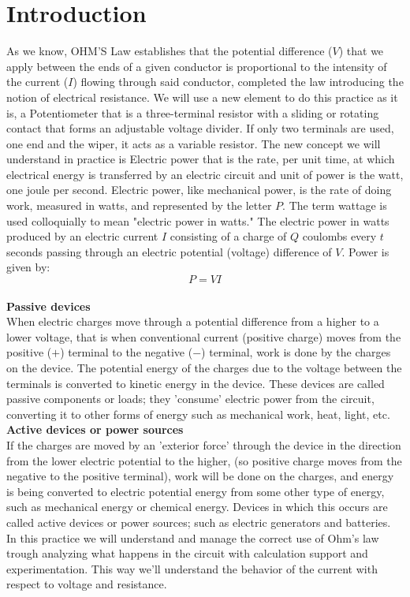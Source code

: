 \documentclass[a4paper]{article}
\begin{document}
\section{Introduction}
As we know, OHM’S Law establishes that the potential difference ($V$) that we apply between the ends
of a given conductor is proportional to the intensity of the current ($I$) flowing through said conductor, completed the law introducing the notion of electrical resistance.
We will use a new element to do this practice as it is, a Potentiometer that is a three-terminal resistor with a sliding or rotating contact that forms an adjustable voltage divider. If only two terminals are used, one end and the wiper, it acts as a variable resistor.
The new concept we will understand in practice is Electric power that is the rate, per unit time, at which electrical energy is transferred by an electric circuit and unit of power is the watt, one joule per second.
Electric power, like mechanical power, is the rate of doing work, measured in watts, and represented
by the letter $P$. The term wattage is used colloquially to mean "electric power in watts." The
electric power in watts produced by an electric current $I$ consisting of a charge of $Q$ coulombs
every $t$ seconds passing through an electric potential (voltage) difference of $V$. Power is given
by:
\[P=VI\]\\
{\large{\textbf{Passive devices}}}\\ When electric charges move through a potential difference from a
higher to a lower voltage, that is when conventional current (positive charge) moves from the
positive ($+$) terminal to the negative ($-$) terminal, work is done by the charges on the device.
The potential energy of the charges due to the voltage between the terminals is converted to kinetic
energy in the device. These devices are called passive components or loads; they 'consume' electric
power from the circuit, converting it to other forms of energy such as mechanical work, heat, light,
etc.\\[2ex]
{\large{\textbf{Active devices or power sources}}}\\ If the charges are moved by an 'exterior force' through the device in the direction from the lower electric potential to the higher, (so positive charge moves from the negative to the positive terminal), work will be done on the charges, and energy is being converted to electric potential energy from some other type of energy, such as mechanical energy or chemical energy. Devices in which this occurs are called active devices or power sources; such as electric generators and batteries.
In this practice we will understand and manage the correct use of Ohm’s law trough analyzing what happens in the circuit with calculation support and experimentation. This way we'll understand the behavior of the current with respect to voltage and resistance.
\newpage
\end{document}
